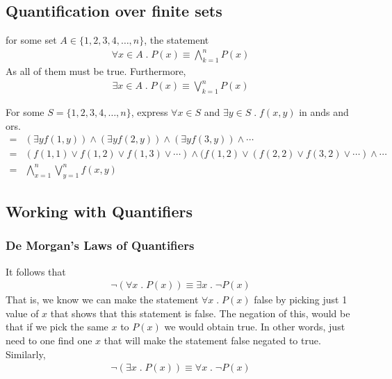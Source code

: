 \documentclass[a4paper]{article}
\theoremstyle{plain}
\theoremstyle{definition}
\newtheorem{exmp}{Example}[section]
\theoremstyle{remark}
\begin{document}
\subsection{Quantification over finite sets}
for some set $A \in \{1,2,3,4,\ldots,n\}$, the statement 
\begin{align*}
	\forall x \in A \; . \; P(x) \equiv \bigwedge_{k=1}^{n}P(x)
\end{align*}
As all of them must be true.
Furthermore,
\begin{align*}
	\exists x \in A \; . \; P(x) \equiv \bigvee_{k=1}^{n} P(x)
\end{align*}
\begin{tcolorbox}[colback=black!3!white,colframe=black!60!white,title=\begin{exmp}Example 1 \label{Example 1}\end{exmp}]
For some $S = \{1,2,3,4,\ldots,n\}$, express $\forall x \in S$ and $ \exists y \in S \; . \; f(x,y)$ in ands and ors.
\begin{align}
	=& (\exists y f(1,y)) \land (\exists y f(2,y)) \land (\exists y f(3,y)) \land\cdots \\
	=&(f(1,1) \lor f(1,2) \lor f(1,3) \lor \cdots) \land (f(1,2) \lor (f(2,2) \lor f(3,2) \lor \cdots ) \land \cdots \\
	=&\bigwedge_{x=1}^n \bigvee_{y=1}^n f(x,y)
\end{align}
\end{tcolorbox}
\subsection{Working with Quantifiers}
\subsubsection{De Morgan's Laws of Quantifiers}

It follows that
\begin{align*}
	\neg (\forall x \; . \; P(x) ) \equiv \exists x \; . \; \neg P(x)
\end{align*}
That is, we know we can make the statement $\forall x \; . \; P(x)$ false by picking just 1 value of $x$ that shows that this statement is false. The negation of this, would be that if we pick the same $x$ to $P(x)$ we would obtain true. In other words, just need to one find one $x$ that will make the statement false negated to true. Similarly,
\begin{align*}
	\neg ( \exists x \; . \; P(x)) \equiv \forall x \; . \; \neg P(x)
\end{align*}
\end{document}
